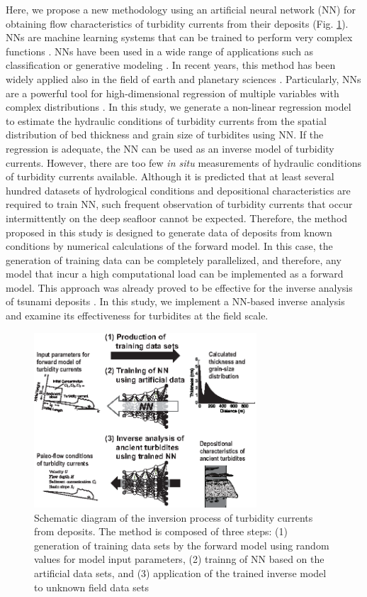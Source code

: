 Here, we propose a new methodology using an artificial neural network (NN) for obtaining flow characteristics of turbidity currents from their deposits (Fig. \ref{fig:schematic_diagram_procedures}). NNs are machine learning systems that can be trained to perform very complex functions \citep{HechtNielsen1987}. NNs have been used in a wide range of applications such as classification \citep{Krizhevsky2012} or generative modeling \citep{Sun2018}. In recent years, this method has been widely applied also in the field of earth and planetary sciences \citep{Laloy2018}. Particularly, NNs are a powerful tool for high-dimensional regression of multiple variables with complex distributions \citep{LeCun2015}. In this study, we generate a non-linear regression model to estimate the hydraulic conditions of turbidity currents from the spatial distribution of bed thickness and grain size of turbidites using NN. If the regression is adequate, the NN can be used as an inverse model of turbidity currents. However, there are too few \textit{in situ} measurements of hydraulic conditions of turbidity currents available. Although it is predicted that at least several hundred datasets of hydrological conditions and depositional characteristics are required to train NN, such frequent observation of turbidity currents that occur intermittently on the deep seafloor cannot be expected. Therefore, the method proposed in this study is designed to generate data of deposits from known conditions by numerical calculations of the forward model. In this case, the generation of training data can be completely parallelized, and therefore, any model that incur a high computational load can be implemented as a forward model. This approach was already proved to be effective for the inverse analysis of tsunami deposits \citep{Mitra2020a}. In this study, we implement a NN-based inverse analysis and examine its effectiveness for turbidites at the field scale.

\begin{figure}[t]
  \includegraphics[width=8.3cm]{fig01.eps}
  \caption{Schematic diagram of the inversion process of turbidity currents from deposits. The method is composed of three steps: (1) generation of training data sets by the forward model using random values for model input parameters, (2) trainng of NN based on the artificial data sets, and (3) application of the trained inverse model to unknown field data sets}
  \label{fig:schematic_diagram_procedures}
\end{figure}


